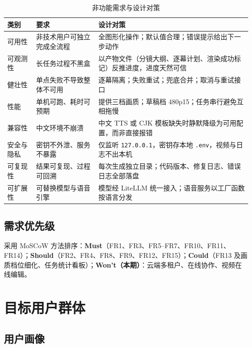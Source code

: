 \documentclass[11pt,a4paper]{ctexart}
\begin{document}
\begin{table}[htbp]
\centering
\small
\caption{非功能需求与设计对策}
\begin{tabularx}{\textwidth}{@{}p{2.6cm} p{4.6cm} X@{}}
\toprule
\textbf{类别} & \textbf{要求} & \textbf{设计对策} \\
\midrule
可用性 & 非技术用户可独立完成全流程 & 全图形化操作；默认值合理；错误提示给出下一步动作 \\
可观测性 & 长任务过程不黑盒 & 以产物文件（分镜大纲、逐幕计划、渲染成功标记）反推进度，进度天然可信 \\
健壮性 & 单点失败不导致整体不可用 & 逐幕隔离；失败重试；兜底合并；取消与重试接口 \\
性能 & 单机可跑、耗时可预期 & 提供三档画质；草稿档 480p15；任务串行避免互相拖慢 \\
兼容性 & 中文环境不崩溃 & 中文 TTS 或 CJK 模板缺失时静默降级为可用配置，而非直接报错 \\
安全与隐私 & 密钥不外泄、服务不暴露 & 仅监听 \texttt{127.0.0.1}，密钥存本地 \texttt{.env}，视频与日志不出本机 \\
可复现性 & 结果可复现、过程可回溯 & 每次生成独立目录；代码版本、修复日志、错误日志全部落盘 \\
可扩展性 & 可替换模型与语音引擎 & 模型经 LiteLLM 统一接入；语音服务以工厂函数按语言分发 \\
\bottomrule
\end{tabularx}
\end{table}

\subsection{需求优先级}

采用 MoSCoW 方法排序：\textbf{Must}（FR1、FR3、FR5--FR7、FR10、FR11、FR14）；\textbf{Should}（FR2、FR4、FR8、FR9、FR12、FR15）；\textbf{Could}（FR13 及画质档位细化、任务统计看板）；\textbf{Won't（本期）}：云端多租户、在线协作、视频在线编辑。

\section{目标用户群体}

\subsection{用户画像}
\end{document}

